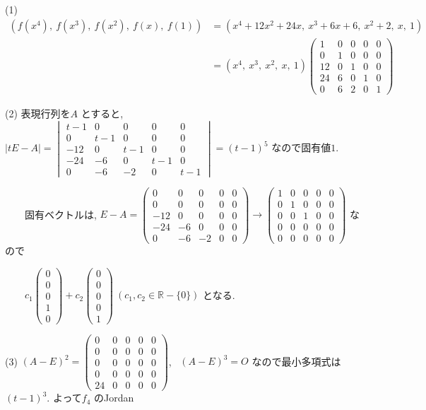 \documentclass{jsarticle}
\begin{document}
(1) \begin{align*}
(f(x^4), \ f(x^3), \ f(x^2), \ f(x), \ f(1)) 
  &= (x^4 + 12x^2 + 24x, \ x^3 + 6x + 6, \ x^2 + 2, \ x, \ 1) \\
  &=(x^4, \ x^3, \ x^2, \ x, \ 1) \begin{pmatrix} 1&0&0&0&0 \\ 0&1&0&0&0 \\ 12&0&1&0&0 \\ 24&6&0&1&0 \\ 0&6&2&0&1 \end{pmatrix}
\end{align*}

(2) 表現行列を$A$ とすると, $| tE - A | = \begin{vmatrix} t-1&0&0&0&0 \\ 0&t-1&0&0&0 \\ -12&0&t-1&0&0 \\ -24&-6&0&t-1&0 \\ 0&-6&-2&0&t-1 \end{vmatrix} = (t-1)^5$ なので固有値$1$. 

\ \ \ \ 固有ベクトルは, $E - A = \begin{pmatrix} 0&0&0&0&0 \\ 0&0&0&0&0 \\ -12&0&0&0&0 \\ -24&-6&0&0&0 \\ 0&-6&-2&0&0 \end{pmatrix} \to \begin{pmatrix} 1&0&0&0&0 \\ 0&1&0&0&0 \\ 0&0&1&0&0 \\ 0&0&0&0&0 \\ 0&0&0&0&0 \end{pmatrix}$ なので 

\ \ \ \ $c_1 \begin{pmatrix} 0\\0\\0\\1\\0 \end{pmatrix} + c_2 \begin{pmatrix} 0\\0\\0\\0\\1 \end{pmatrix} \ (c_1, c_2 \in \mathbb{R} - \{0\})$ となる. 

(3) $(A-E)^2 = \begin{pmatrix} 0&0&0&0&0 \\ 0&0&0&0&0 \\ 0&0&0&0&0 \\ 0&0&0&0&0 \\ 24&0&0&0&0 \end{pmatrix}$, \ $(A-E)^3 = O$ なので最小多項式は$(t-1)^3$. よって$f_4$ のJordan
\end{document}
